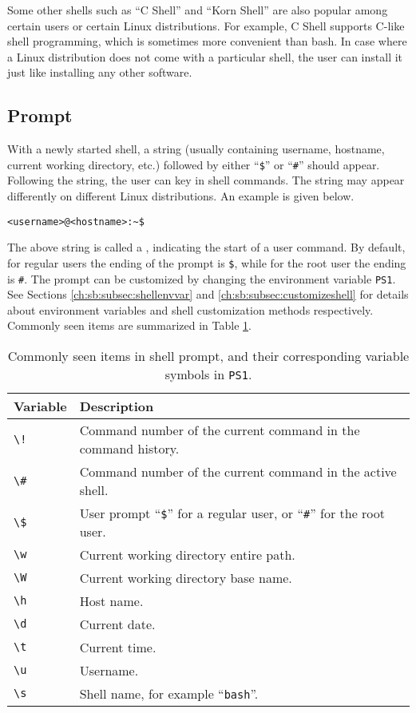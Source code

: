 Some other shells such as ``C Shell'' and ``Korn Shell'' are also popular among certain users or certain Linux distributions. For example, C Shell supports C-like shell programming, which is sometimes more convenient than bash. In case where a Linux distribution does not come with a particular shell, the user can install it just like installing any other software.

\subsection{Prompt}

With a newly started shell, a string (usually containing username, hostname, current working directory, etc.) followed by either ``\verb|$|'' or ``\verb|#|'' should appear. Following the string, the user can key in shell commands. The string may appear differently on different Linux distributions. An example is given below.
\begin{lstlisting}
<username>@<hostname>:~$
\end{lstlisting}

The above string is called a , indicating the start of a user command. By default, for regular users the ending of the prompt is \verb|$|, while for the root user the ending is \verb|#|. The prompt can be customized by changing the environment variable \verb|PS1|. See Sections \ref{ch:sb:subsec:shellenvvar} and \ref{ch:sb:subsec:customizeshell} for details about environment variables and shell customization methods respectively. Commonly seen items are summarized in Table \ref{ch:sb:tab:promptvariable}.

\begin{table}
	\centering \caption{Commonly seen items in shell prompt, and their corresponding variable symbols in \texttt{PS1}.}\label{ch:sb:tab:promptvariable}
	\begin{tabularx}{\textwidth}{lX}
		\hline
		Variable & Description \\ \hline
		\verb|\!| & Command number of the current command in the command history. \\ 
		\verb|\#| & Command number of the current command in the active shell. \\ 
		\verb|\$| & User prompt ``\verb|$|'' for a regular user, or ``\verb|#|'' for the root user. \\
		\verb|\w| & Current working directory entire path. \\ 
		\verb|\W| & Current working directory base name. \\ 
		\verb|\h| & Host name. \\ 
		\verb|\d| & Current date. \\ 
		\verb|\t| & Current time. \\ 
		\verb|\u| & Username. \\ 
		\verb|\s| & Shell name, for example ``\verb|bash|''. \\ 
		\hline
	\end{tabularx}
\end{table}

